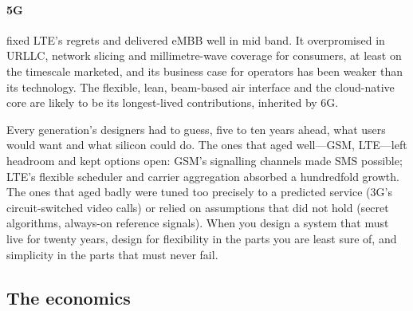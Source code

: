 \paragraph{5G} fixed LTE's regrets and delivered eMBB well in mid band. It overpromised in URLLC,
network slicing and millimetre-wave coverage for consumers, at least on the timescale marketed, and
its business case for operators has been weaker than its technology. The flexible, lean, beam-based
air interface and the cloud-native core are likely to be its longest-lived contributions, inherited
by 6G.

\begin{keyidea}
Every generation's designers had to guess, five to ten years ahead, what users would want and what
silicon could do. The ones that aged well---GSM, LTE---left headroom and kept options open: GSM's
signalling channels made SMS possible; LTE's flexible scheduler and carrier aggregation absorbed a
hundredfold growth. The ones that aged badly were tuned too precisely to a predicted service (3G's
circuit-switched video calls) or relied on assumptions that did not hold (secret algorithms,
always-on reference signals). When you design a system that must live for twenty years, design for
flexibility in the parts you are least sure of, and simplicity in the parts that must never fail.
\end{keyidea}


\subsection{The economics}


